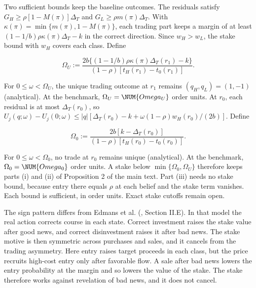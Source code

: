 Two sufficient bounds keep the baseline outcomes. The residuals
satisfy \(G_H\ge\rho[1-M(\pi)]\Delta_T\) and
\(G_L\ge\rho m(\pi)\Delta_T\). With
\(\kappa(\pi)=\min\{m(\pi),1-M(\pi)\}\), each trading part keeps a
margin of at least \((1-1/b)\rho\kappa(\pi)\Delta_T-k\) in the
correct direction. Since \(w_H>w_L\), the stake bound with \(w_H\)
covers each class. Define

\[
\Omega_U:=
\frac{2b\{(1-1/b)\rho\kappa(\pi)\Delta_T(r_1)-k\}}
{(1-\rho)[t_H(r_1)-t_0(r_1)]}.
\]

For \(0\le\omega<\Omega_U\), the unique trading outcome at \(r_1\)
remains \((q_H,q_L)=(1,-1)\) (analytical). At the benchmark,
\(\Omega_U=\NUM{Omega_U}\) order units. At \(r_0\), each residual is
at most \(\Delta_T(r_0)\), so
\(U_j(q;\omega)-U_j(0;\omega)\le
|q|[\Delta_T(r_0)-k+\omega(1-\rho)w_H(r_0)/(2b)]\). Define

\[
\Omega_0:=
\frac{2b[k-\Delta_T(r_0)]}
{(1-\rho)[t_H(r_0)-t_0(r_0)]}.
\]

For \(0\le\omega<\Omega_0\), no trade at \(r_0\) remains unique
(analytical). At the benchmark, \(\Omega_0=\NUM{Omega_0}\) order
units. A stake below \(\min\{\Omega_0,\Omega_U\}\) therefore keeps
parts (i) and (ii) of Proposition 2 of the main text. Part (iii)
needs no stake bound, because entry there equals \(\rho\) at each
belief and the stake term vanishes. Each bound is sufficient, in
order units. Exact stake cutoffs remain open.

The sign pattern differs from Edmans et al.
(, Section II.E). In
that model the real action corrects course in each state. Correct
investment raises the stake value after good news, and correct
disinvestment raises it after bad news. The stake motive is then
symmetric across purchases and sales, and it cancels from the
trading asymmetry. Here entry raises target proceeds in each class,
but the price recruits high-cost entry only after favorable flow. A
sale after bad news lowers the entry probability at the margin and
so lowers the value of the stake. The stake therefore works against
revelation of bad news, and it does not cancel.

